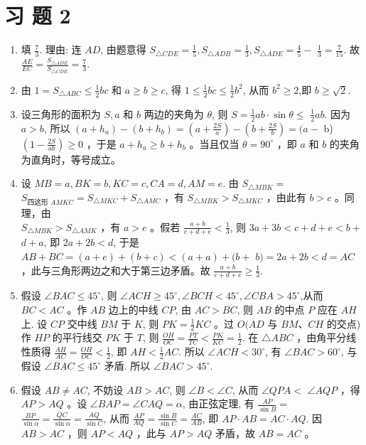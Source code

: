 \documentclass[10pt]{article}
\begin{document}
\section*{习 题 2}
\begin{enumerate}
  \item 填 $\frac{7}{3}$. 理由: 连 $A D$, 由题意得 $S_{\triangle C D E}=\frac{1}{5}, S_{\triangle A D B}=\frac{1}{3}, S_{\triangle A D E}=\frac{4}{5}-$ $\frac{1}{3}=\frac{7}{15}$. 故 $\frac{A E}{E C}=\frac{S_{\triangle A D E}}{S_{\triangle C D E}}=\frac{7}{3}$.
  \item 由 $1=S_{\triangle A B C} \leqslant \frac{1}{2} b c$ 和 $a \geqslant b \geqslant c$, 得 $1 \leqslant \frac{1}{2} b c \leqslant \frac{1}{2} b^{2}$, 从而 $b^{2} \geqslant 2$,即 $b \geqslant \sqrt{2}$.
  \item 设三角形的面积为 $S, a$ 和 $b$ 两边的夹角为 $\theta$, 则 $S=\frac{1}{2} a b \cdot \sin \theta \leqslant$ $\frac{1}{2} a b$. 因为 $a>b$, 所以 $\left(a+h_{a}\right)-\left(b+h_{b}\right)=\left(a+\frac{2 S}{a}\right)-\left(b+\frac{2 S}{b}\right)=(a-$ b) $\left(1-\frac{2 S}{a b}\right) \geqslant 0$ ，于是 $a+h_{a} \geqslant b+h_{b}$ 。当且仅当 $\theta=90^{\circ}$ ，即 $a$ 和 $b$ 的夹角为直角时，等号成立。
  \item 设 $M B=a, B K=b, K C=c, C A=d, A M=e$. 由 $S_{\triangle M B K}=$ $S_{\text {四这形 } A M K C}=S_{\triangle M K C}+S_{\triangle A M C}$ ，有 $S_{\triangle M B K}>S_{\triangle M K C}$ ，由此有 $b>c$ 。同理，由\\
$S_{\triangle M B K}>S_{\triangle A M K}$ ，有 $a>e$ 。假若 $\frac{a+b}{c+d+e}<\frac{1}{3}$, 则 $3 a+3 b<c+d+e<b+$ $d+a$, 即 $2 a+2 b<d$, 于是 $A B+B C=(a+e)+(b+c)<(a+a)+(b+$ $b)=2 a+2 b<d=A C$ ，此与三角形两边之和大于第三边矛盾。故 $\frac{a+b}{c+d+e} \geqslant \frac{1}{3}$.
  \item 假设 $\angle B A C \leqslant 45^{\circ}$, 则 $\angle A C H \geqslant 45^{\circ}, \angle B C H<45^{\circ}, \angle C B A>45^{\circ}$,从而 $B C<A C$ 。作 $A B$ 边上的中线 $C P$, 由 $A C>B C$, 则 $A B$ 的中点 $P$ 应在 $A H$ 上. 设 $C P$ 交中线 $B M$ 于 $K$, 则 $P K=\frac{1}{2} K C$ 。过 $O(A D$ 与 $B M 、 C H$ 的交点) 作 $H P$ 的平行线交 $P K$ 于 $T$, 则 $\frac{O H}{O C}=\frac{P T}{T C}<\frac{P K}{K C}=\frac{1}{2}$. 在 $\triangle A B C$ ，由角平分线性质得 $\frac{A H}{A C}=\frac{O H}{O C}<\frac{1}{2}$, 即 $A H<\frac{1}{2} A C$. 所以 $\angle A C H<30^{\circ}$, 有 $\angle B A C>60^{\circ}$, 与假设 $\angle B A C \leqslant 45^{\circ}$ 矛盾. 所以 $\angle B A C>45^{\circ}$.
  \item 假设 $A B \neq A C$, 不妨设 $A B>A C$, 则 $\angle B<\angle C$, 从而 $\angle Q P A<$ $\angle A Q P$ ，得 $A P>A Q$ 。设 $\angle B A P=\angle C A Q=\alpha$, 由正弦定理, 有 $\frac{A P}{\sin B}=$ $\frac{B P}{\sin \alpha}=\frac{Q C}{\sin \alpha}=\frac{A Q}{\sin C}$, 从而 $\frac{A P}{A Q}=\frac{\sin B}{\sin C}=\frac{A C}{A B}$, 即 $A P \cdot A B=A C \cdot A Q$. 因 $A B>A C$ ，则 $A P<A Q$ ，此与 $A P>A Q$ 矛盾，故 $A B=A C$ 。

\end{enumerate}
\end{document}
